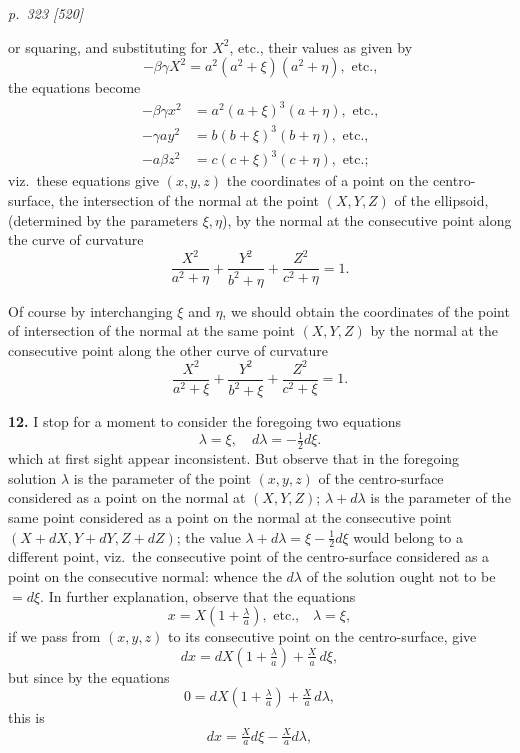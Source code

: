 \documentclass[11pt,a4paper]{article}
\theoremstyle{plain}
\theoremstyle{definition}
\begin{document}
\clearpage

\bigskip
\textit{p.~323 [520]}
\smallskip

or squaring, and substituting for $X^2$, etc., their values as given by
\[
-\beta\gamma X^2 = a^2(a^2 + \xi)(a^2 + \eta), \text{ etc.,}
\]
the equations become
\begin{align*}
-\beta\gamma x^2 &= a^2(a + \xi)^3(a + \eta), \text{ etc.,}\\
-\gamma a y^2 &= b(b + \xi)^3(b + \eta), \text{ etc.,}\\
-a\beta z^2 &= c(c + \xi)^3(c + \eta), \text{ etc.;}
\end{align*}
viz.\ these equations give $(x, y, z)$ the coordinates of a point on the centro-surface, the intersection of the normal at the point $(X, Y, Z)$ of the ellipsoid, (determined by the parameters $\xi, \eta$), by the normal at the consecutive point along the curve of curvature
\[
\frac{X^2}{a^2 + \eta} + \frac{Y^2}{b^2 + \eta} + \frac{Z^2}{c^2 + \eta} = 1.
\]

Of course by interchanging $\xi$ and $\eta$, we should obtain the coordinates of the point of intersection of the normal at the same point $(X, Y, Z)$ by the normal at the consecutive point along the other curve of curvature
\[
\frac{X^2}{a^2 + \xi} + \frac{Y^2}{b^2 + \xi} + \frac{Z^2}{c^2 + \xi} = 1.
\]

\textbf{12.} I stop for a moment to consider the foregoing two equations
\[
\lambda = \xi,\quad d\lambda = -\tfrac{1}{2}d\xi.
\]
which at first sight appear inconsistent. But observe that in the foregoing solution $\lambda$ is the parameter of the point $(x, y, z)$ of the centro-surface considered as a point on the normal at $(X, Y, Z)$; $\lambda + d\lambda$ is the parameter of the same point considered as a point on the normal at the consecutive point $(X + dX, Y + dY, Z + dZ)$; the value $\lambda + d\lambda = \xi - \tfrac{1}{2}d\xi$ would belong to a different point, viz.\ the consecutive point of the centro-surface considered as a point on the consecutive normal: whence the $d\lambda$ of the solution ought not to be $= d\xi$. In further explanation, observe that the equations
\[
x = X\!\left(1 + \tfrac{\lambda}{a}\right), \text{ etc.,} \quad\lambda = \xi,
\]
if we pass from $(x, y, z)$ to its consecutive point on the centro-surface, give
\[
dx = dX\!\left(1 + \tfrac{\lambda}{a}\right) + \tfrac{X}{a}\,d\xi,
\]
but since by the equations
\[
0 = dX\!\left(1 + \tfrac{\lambda}{a}\right) + \tfrac{X}{a}\,d\lambda,
\]
this is
\[
dx = \tfrac{X}{a}d\xi - \tfrac{X}{a}d\lambda,
\]
\end{document}
